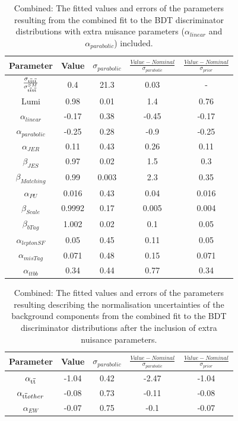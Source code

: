 \begin{table}[ht!]
\centering
\begin{tabular}{| c c cc c |}
\hline  
  Parameter &   Value & $\sigma_{parabolic}$ &    $\frac{Value-Nominal}{\sigma_{parabolic}}$ &    $\frac{Value-Nominal}{\sigma_{prior}}$ \\
\hline   
$\frac{\sigma_{\mathrm{t}\overline{\mathrm{t}}\mathrm{t}\overline{\mathrm{t}}}}{\sigma^{SM}_{\mathrm{t}\overline{\mathrm{t}}\mathrm{t}\overline{\mathrm{t}}}}$  & 0.4  & 21.3 &  0.03 & - \\
    \hline  
    Lumi  &   0.98 &  0.01  & 1.4 & 0.76  \\
    \hline  
    $\alpha_{linear}$ & -0.17 &  0.38   & -0.45  & -0.17  \\  
    \hline  
    $\alpha_{parabolic}$ & -0.25 &  0.28   & -0.9  & -0.25  \\  
    \hline  
    $\alpha_{JER}$ & 0.11 &  0.43   & 0.26  & 0.11  \\  
    \hline  
    $\beta_{JES}$  & 0.97  & 0.02   &  1.5 & 0.3   \\
    \hline   
    $\beta_{Matching}$ & 0.99 &  0.003   & 2.3   & 0.35 \\  
    \hline  
    $\alpha_{PU}$  & 0.016  & 0.43 & 0.04 &  0.016 \\
    \hline  
    $\beta_{Scale}$  & 0.9992 & 0.17   & 0.005  & 0.004 \\ 
    \hline  
    $\beta_{bTag}$ & 1.002    & 0.02   &  0.1  &  0.05 \\
    \hline  
    $\alpha_{leptonSF}$ & 0.05 & 0.45    &  0.11   & 0.05   \\   
    \hline  
    $\alpha_{misTag}$ & 0.071   & 0.48   & 0.15  &   0.071 \\
    \hline  
    $\alpha_{ttbb}$  & 0.34  & 0.44 &  0.77 & 0.34 \\
    \hline
\end{tabular}
\caption{Combined: The fitted values and errors of the parameters resulting from the combined fit to the BDT discriminator distributions with extra nuisance parameters ($\alpha_{linear}$ and $\alpha_{parabolic}$) included.  }
\label{tab:extraparams1}
\end{table}


\begin{table}[ht!]
\centering
\begin{tabular}{| c c cc c |}
 \hline  
    Parameter &   Value & $\sigma_{parabolic}$ &    $\frac{Value-Nominal}{\sigma_{parabolic}}$ &    $\frac{Value-Nominal}{\sigma_{prior}}$ \\
    \hline   
    $\alpha_{\mathrm{t}\overline{\mathrm{t}}}$ &   -1.04 &  0.42 & -2.47  & -1.04  \\  
    \hline  
    $\alpha_{\mathrm{t}\overline{\mathrm{t}} other}$  & -0.08  &0.73 & -0.11 & -0.08 \\
    \hline   
    $\alpha_{EW}$ & -0.07 &  0.75 &  -0.1 &  -0.07\\  
    \hline  
\end{tabular}
\caption{Combined: The fitted values and errors of the parameters resulting describing the normalisation uncertainties of the background components from the combined fit to the BDT discriminator distributions after the inclusion of extra nuisance parameters. }
\label{tab:extraparams2}
\end{table}




